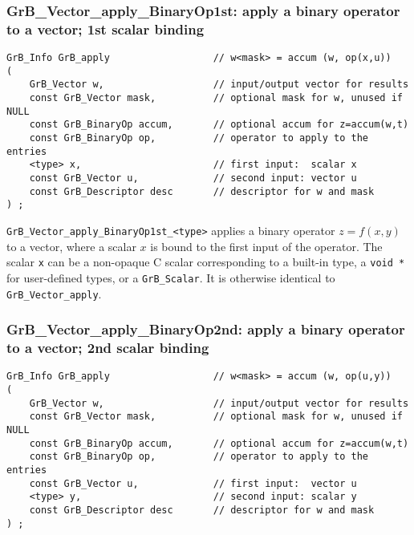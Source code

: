 \documentclass[12pt]{article}
\begin{document}
\newpage
\subsubsection{{\sf GrB\_Vector\_apply\_BinaryOp1st:} apply a binary operator to a vector; 1st scalar binding}
\label{vector_apply1st}

\begin{mdframed}[userdefinedwidth=6in]
{\footnotesize
\begin{verbatim}
GrB_Info GrB_apply                  // w<mask> = accum (w, op(x,u))
(
    GrB_Vector w,                   // input/output vector for results
    const GrB_Vector mask,          // optional mask for w, unused if NULL
    const GrB_BinaryOp accum,       // optional accum for z=accum(w,t)
    const GrB_BinaryOp op,          // operator to apply to the entries
    <type> x,                       // first input:  scalar x
    const GrB_Vector u,             // second input: vector u
    const GrB_Descriptor desc       // descriptor for w and mask
) ;
\end{verbatim} } \end{mdframed}

\verb'GrB_Vector_apply_BinaryOp1st_<type>'  applies a binary operator
$z=f(x,y)$ to a vector, where a scalar $x$ is bound to the first input of the
operator.
The scalar \verb'x' can be a non-opaque C scalar corresponding to a built-in
type, a \verb'void *' for user-defined types, or a \verb'GrB_Scalar'.
It is otherwise identical to \verb'GrB_Vector_apply'.

\subsubsection{{\sf GrB\_Vector\_apply\_BinaryOp2nd:} apply a binary operator to a vector; 2nd scalar binding}
\label{vector_apply2nd}

\begin{mdframed}[userdefinedwidth=6in]
{\footnotesize
\begin{verbatim}
GrB_Info GrB_apply                  // w<mask> = accum (w, op(u,y))
(
    GrB_Vector w,                   // input/output vector for results
    const GrB_Vector mask,          // optional mask for w, unused if NULL
    const GrB_BinaryOp accum,       // optional accum for z=accum(w,t)
    const GrB_BinaryOp op,          // operator to apply to the entries
    const GrB_Vector u,             // first input:  vector u
    <type> y,                       // second input: scalar y
    const GrB_Descriptor desc       // descriptor for w and mask
) ;
\end{verbatim} } \end{mdframed}
\end{document}
